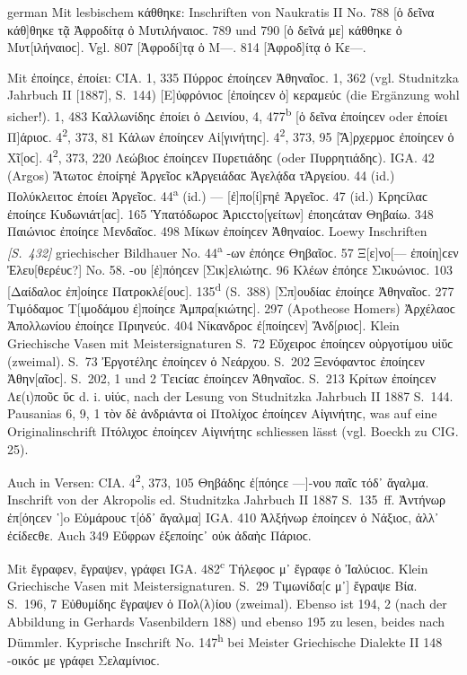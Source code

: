 \begin{otherlanguage*}{german}
Mit lesbischem κάθθηκε: Inschriften von Naukratis II No. 788 [ὁ δεῖνα κάθ]θη\-κε τᾷ Ἀφροδίτᾳ ὀ Μυτιλήναιοϲ. 789 und 790 [ὁ δεῖνά με] κάθθηκε ὀ Μυ\-τ[ι\-λή\-ναι\-οϲ]. Vgl. 807 [Ἀφροδί]τᾳ ὁ Μ—. 814 [Ἀφροδ]ίτᾳ ὁ Κε—.

Mit ἐποίηϲε, ἐποίει: CΙΑ. 1, 335 Πύρροϲ ἐποίηϲεν Ἀθηναῖοϲ. 1, 362 (vgl. Stud\-nitz\-ka Jahrbuch II [1887], S.~144) [Ε]ὐφρόνιοϲ [ἐποίηϲεν ὁ] κεραμεύϲ (die Ergänzung wohl sicher!). 1, 483 Καλλωνίδηϲ ἐποίει ὁ Δεινίου, 4, 477\textsuperscript{b} [ὁ δεῖνα ἐποίηϲεν oder ἐποίει Π]άριοϲ. 4\textsuperscript{2}, 373, 81 Κάλων ἐποίηϲεν Αἱ[γινήτηϲ]. 4\textsuperscript{2}, 373, 95 [Ἄ]ρχερμοϲ ἐποίηϲεν ὁ Χῖ[οϲ]. 4\textsuperscript{2}, 373, 220 Λεώβιοϲ ἐποίηϲεν Πυρετιάδηϲ (oder Πυρρητιάδηϲ). IGA. 42 (Argos) Ἄτωτοϲ ἐποίϝηἑ Ἀργεῖοϲ κἈργειάδαϲ Ἁγελᾴδα τἈργείου. 44 (id.) Πολύκλειτοϲ ἐποίει Ἀργεῖοϲ. 44\textsuperscript{a} (id.) — [ἐ]πο[ί]ϝηἑ Ἀργεῖοϲ. 47 (id.) Κρηϲίλαϲ ἐποίηϲε Κυδωνιάτ[αϲ]. 165 Ὑπατόδωροϲ Ἀριϲϲτο[γείτων] ἐποη\-ϲάταν Θηβαίω. 348 Παιώνιοϲ ἐποίηϲε Μενδαῖοϲ. 498 Μίκων ἐποίηϲεν Ἀθη\-ναί\-οϲ. Loewy Inschriften \hypertarget{p432}{\emph{[S.~432]}}\label{p432} griechischer Bildhauer No. 44\textsuperscript{a} -ων ἐπόηϲε Θηβαῖοϲ. 57 Ξ[ε]νο[— ἐποίη]ϲεν Ἐλευ[θερέυϲ?] No. 58. -ου [ἐ]πόηϲεν [Σικ]ε\-λι\-ώ\-τηϲ. 96 Κλέων ἐπόηϲε Σικυώνιοϲ. 103 [Δαίδαλοϲ ἐπ]οίηϲε Πατροκλέ[ουϲ]. 135\textsuperscript{d} (S.~388) [Σπ]ουδίαϲ ἐποίηϲε Ἀθηναῖοϲ. 277 Τιμόδαμοϲ Τ[ιμοδάμου ἐ]ποίηϲε Ἀμπρα[κιώ\-τηϲ]. 297 (Apotheose Homers) Ἀρχέλαοϲ Ἀπολλωνίου ἐποίηϲε Πρι\-η\-νεύϲ. 404 Νίκανδροϲ ἐ[ποίηϲεν] Ἄνδ[ριοϲ]. Klein Griechische Vasen mit Meistersignaturen S.~72 Εὔχειροϲ ἐποίηϲεν οὑργοτίμου υἱὕϲ (zweimal). S.~73 Ἐργοτέληϲ ἐποίηϲεν ὁ Νεάρχου. S.~202 Ξενόφαντοϲ ἐποίηϲεν Ἀθην[αῖοϲ]. S.~202, 1 und 2 Τειϲίαϲ ἐποίηϲεν Ἁθηναῖοϲ. S.~213 Κρίτων ἐποίηϲεν Λε(ι)ποῦϲ ὕϲ d. i. υἱύϲ, nach der Lesung von Studnitzka Jahrbuch II 1887 S.~144. Pausanias 6, 9, 1 τὸν δὲ ἀνδριάντα οἱ Πτολίχοϲ ἐποίηϲεν Αἰγινήτηϲ, was auf eine Originalinschrift Πτόλιχοϲ ἐποίηϲεν Αἰγινήτηϲ schliessen lässt (vgl. Boeckh zu CIG. 25).

Auch in Versen: CIA. 4\textsuperscript{2}, 373, 105 Θηβάδηϲ ἐ[πόηϲε —]-νου παῖϲ τόδ᾽ ἄγαλμα. Inschrift von der Akropolis ed. Studnitzka Jahrbuch II 1887 S.~135~ff. Ἀντήνωρ ἐπ[όηϲεν ῾]o Εὐμάρουϲ τ[όδ᾽ ἄγαλμα] IGA. 410 Ἀλξήνωρ ἐποίηϲεν ὁ Νάξιοϲ, ἀλλ᾽ ἐϲίδεϲθε. Auch 349 Εὔφρων ἐξεποίηϲ᾽ οὐκ ἀδαὴϲ Πάριοϲ.

Mit ἔγραφεν, ἔγραψεν, γράφει IGA. 482\textsuperscript{c} Τήλεφοϲ μ᾽ ἔγραφε ὁ Ἰαλύϲιοϲ. Klein Griechische Vasen mit Meistersignaturen. S.~29 Τιμωνίδα[ϲ μ᾽] ἔγραψε Βία. S.~196, 7 Εὐθυμίδηϲ ἔγραψεν ὁ Πολ(λ)ίου (zweimal). Ebenso ist 194, 2 (nach der Abbildung in Gerhards Vasenbildern 188) und ebenso 195 zu lesen, beides nach Dümmler. Kyprische Inschrift No. 147\textsuperscript{h} bei Meister Griechische Dialekte II 148 -οικόϲ με γράφει Σελαμίνιοϲ.


\end{otherlanguage*}
